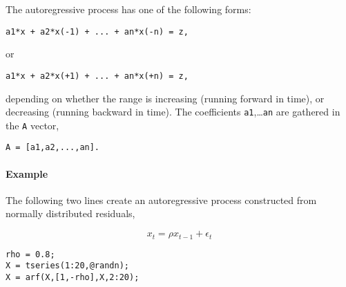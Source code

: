 The autoregressive process has one of the following forms:

\begin{verbatim}
a1*x + a2*x(-1) + ... + an*x(-n) = z,
\end{verbatim}

or

\begin{verbatim}
a1*x + a2*x(+1) + ... + an*x(+n) = z,
\end{verbatim}

depending on whether the range is increasing (running forward in time),
or decreasing (running backward in time). The coefficients
\texttt{a1},\ldots{}\texttt{an} are gathered in the \texttt{A} vector,

\begin{verbatim}
A = [a1,a2,...,an].
\end{verbatim}

\paragraph{Example}\label{example}

The following two lines create an autoregressive process constructed
from normally distributed residuals,

\[ x_t = \rho x_{t-1} + \epsilon_t \]

\begin{verbatim}
rho = 0.8;
X = tseries(1:20,@randn);
X = arf(X,[1,-rho],X,2:20);
\end{verbatim}


